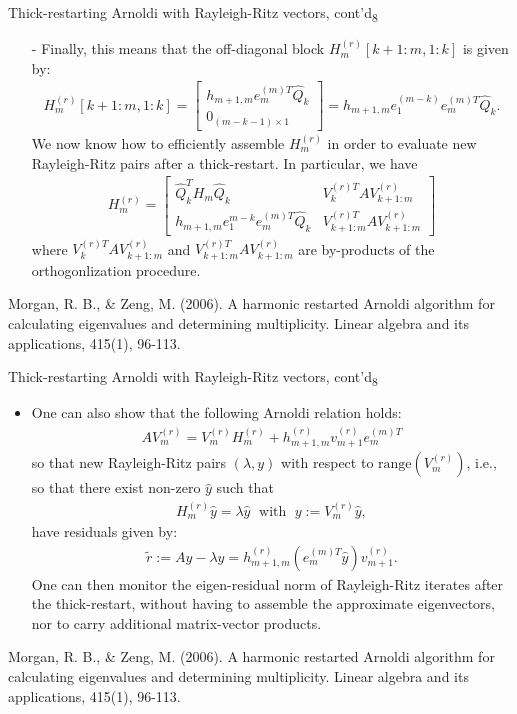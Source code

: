 \documentclass[t,usepdftitle=false]{beamer}
\begin{document}
\begin{frame}{Thick-restarting Arnoldi with Rayleigh-Ritz vectors, cont'd\textsubscript{8}}
\begin{itemize}
\item[-] Finally, this means that the off-diagonal block $H_m^{(r)}[k+1\!:\!m,1\!:\!k]$ is given by:
\begin{align*}
H_m^{(r)}[k+1\!:\!m,1\!:\!k]
=
\begin{bmatrix}
h_{m+1,m}e_m^{(m)T}\hat{Q}_k\\
0_{{(m-k-1)}\times 1}
\end{bmatrix}
=
h_{m+1,m}e_1^{(m-k)}e_m^{(m)T}\hat{Q}_k.
\end{align*}
We now know how to efficiently assemble $H_m^{(r)}$ in order to evaluate new Rayleigh-Ritz pairs after a thick-restart.
In particular, we have
\begin{align*}
H_m^{(r)}
=
\begin{bmatrix}
\hat{Q}_k^TH_m\hat{Q}_k&V_k^{(r)T}AV_{k+1:m}^{(r)}\\
h_{m+1,m}e_1^{m-k}e_m^{(m)T}\hat{Q}_k&V_{k+1:m}^{(r)T}AV_{k+1:m}^{(r)}
\end{bmatrix}
\end{align*}
where $V_k^{(r)T}AV_{k+1:m}^{(r)}$ and $V_{k+1:m}^{(r)T}AV_{k+1:m}^{(r)}$ are by-products of the orthogonlization procedure.
\end{itemize}\smallskip
\tiny{Morgan, R. B., \& Zeng, M. (2006). A harmonic restarted Arnoldi algorithm for calculating eigenvalues and determining
multiplicity. Linear algebra and its applications, 415(1), 96-113.}
\end{frame}

\begin{frame}{Thick-restarting Arnoldi with Rayleigh-Ritz vectors, cont'd\textsubscript{8}}
\begin{itemize}
\item One can also show that the following Arnoldi relation holds:
\begin{align*}
AV_m^{(r)}=V_m^{(r)}H_m^{(r)}+h^{(r)}_{m+1,m}v_{m+1}^{(r)}e_m^{(m)T}
\end{align*}
so that new Rayleigh-Ritz pairs $(\lambda,y)$ with respect to $\text{range}(V_m^{(r)})$, i.e., so that there exist non-zero $\hat{y}$ such that 
\begin{align*}
H_m^{(r)}\hat{y}=\lambda\hat{y}
\;\text{ with }\;
y:=V_m^{(r)}\hat{y},
\end{align*}
have residuals given by:
\begin{align*}
\tilde{r}:=Ay-\lambda y=h_{m+1,m}^{(r)}(e_m^{(m)T}\hat{y})v_{m+1}^{(r)}.
\end{align*}
One can then monitor the eigen-residual norm of Rayleigh-Ritz iterates after the thick-restart, without having to assemble the approximate eigenvectors, nor to carry additional matrix-vector products.
\end{itemize}\smallskip
\tiny{Morgan, R. B., \& Zeng, M. (2006). A harmonic restarted Arnoldi algorithm for calculating eigenvalues and determining
multiplicity. Linear algebra and its applications, 415(1), 96-113.}
\end{frame}
\end{document}
